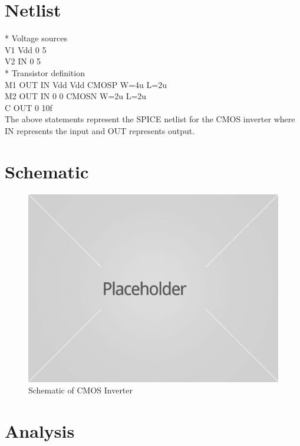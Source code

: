 \documentclass[12pt,a4paper]{article}
\begin{document}
\section{Netlist}

* Voltage sources \\
V1 Vdd 0 5 \\
V2 IN 0 5 \\

* Transistor definition \\
M1 OUT IN Vdd Vdd CMOSP W=4u L=2u \\
M2 OUT IN 0 0 CMOSN W=2u L=2u \\
C OUT 0 10f \\

The above statements represent the SPICE netlist for the CMOS inverter where IN represents the input and OUT represents output.

\section{Schematic}

\begin{figure}[H]
\begin{center}
\includegraphics[scale=0.2]{placeholder.jpg}
\caption{Schematic of CMOS Inverter}
\end{center}
\end{figure}


\section{Analysis}
\end{document}
